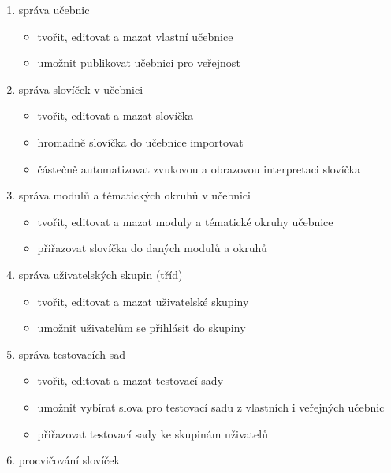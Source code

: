 \documentclass[a4paper,11pt,titlepage,fleqn]{article}
\begin{document}
        \begin{enumerate}
            \item správa učebnic
                \begin{itemize}
                    \item tvořit, editovat a mazat vlastní učebnice
                    \item umožnit publikovat učebnici pro veřejnost
                \end{itemize} 
            \item správa slovíček v učebnici
                \begin{itemize}
                    \item tvořit, editovat a mazat slovíčka
                    \item hromadně slovíčka do učebnice importovat
                    \item částečně automatizovat zvukovou a obrazovou interpretaci slovíčka
                \end{itemize} 
            \item správa modulů a tématických okruhů v učebnici
                \begin{itemize}
                    \item tvořit, editovat a mazat moduly a tématické okruhy učebnice
                    \item přiřazovat slovíčka do daných modulů a okruhů
                \end{itemize}
            \item správa uživatelských skupin (tříd)
                \begin{itemize}
                    \item tvořit, editovat a mazat uživatelské skupiny
                    \item umožnit uživatelům se přihlásit do skupiny
                \end{itemize}
            \item správa testovacích sad
                \begin{itemize}
                    \item tvořit, editovat a mazat testovací sady
                    \item umožnit vybírat slova pro testovací sadu z vlastních i veřejných učebnic
                    \item přiřazovat testovací sady ke skupinám uživatelů
                \end{itemize}
            \item procvičování slovíček

\end{enumerate}
\end{document}
